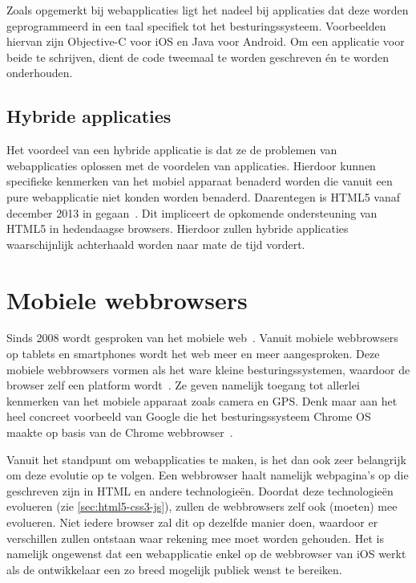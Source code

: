 Zoals opgemerkt bij webapplicaties ligt het nadeel bij  applicaties dat deze worden geprogrammeerd in een taal specifiek tot het besturingssysteem.
Voorbeelden hiervan zijn Objective-C voor iOS en Java voor Android.
Om een applicatie voor beide te schrijven, dient de code tweemaal te worden geschreven én te worden onderhouden.

\subsection{Hybride applicaties}
\label{sec:literatuur-hydribe}
Het voordeel van een hybride applicatie is dat ze de problemen van webapplicaties oplossen met de voordelen van  applicaties.
Hierdoor kunnen specifieke kenmerken van het mobiel apparaat benaderd worden die vanuit een pure webapplicatie niet konden worden benaderd.
Daarentegen is HTML5 vanaf december 2013 in  gegaan~\cite{Jacobs2012}.
Dit impliceert de opkomende ondersteuning van HTML5 in hedendaagse browsers.
Hierdoor zullen hybride applicaties waarschijnlijk achterhaald worden naar mate de tijd vordert.


\section{Mobiele webbrowsers}
\label{sec:mobiele-webbrowsers}
Sinds 2008 wordt gesproken van het mobiele web~\cite{Hales2012}. 
Vanuit mobiele webbrowsers op tablets en smartphones wordt het web meer en meer aangesproken. 
Deze mobiele webbrowsers vormen als het ware kleine besturingssystemen, waardoor de browser zelf een platform wordt~\cite{Hales2012}. 
Ze geven namelijk toegang tot allerlei kenmerken van het mobiele apparaat zoals camera en GPS. 
Denk maar aan het heel concreet voorbeeld van Google die het besturingssysteem Chrome OS maakte op basis van de Chrome webbrowser~\cite{Hales2012}.

Vanuit het standpunt om webapplicaties te maken, is het dan ook zeer belangrijk om deze evolutie op te volgen. 
Een webbrowser haalt namelijk webpagina's op die geschreven zijn in HTML en andere technologieën. 
Doordat deze technologieën evolueren (zie \ref{sec:html5-css3-js}), zullen de webbrowsers zelf ook (moeten) mee evolueren. 
Niet iedere browser zal dit op dezelfde manier doen, waardoor er verschillen zullen ontstaan waar  rekening mee moet worden gehouden. 
Het is namelijk ongewenst dat een webapplicatie enkel op de webbrowser van iOS werkt als de ontwikkelaar een zo breed mogelijk publiek wenst te bereiken. 

